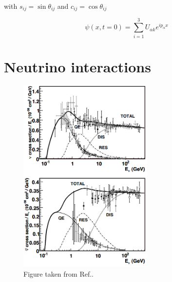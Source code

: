 with $s_{ij}=\sin \theta_{ij}$ and $c_{ij}=\cos \theta_{ij}$

\begin{equation} %
    \psi(x,t=0)=\sum_{i=1}^{3}U_{\alpha k}e^{ip_{\alpha}x}
\end{equation} %

\section{Neutrino interactions}
\label{sec:theory_interactions}

\begin{figure} %
    \includegraphics[origin=c,width=0.6\textwidth]{diagrams/3-theory/cross_sections.png}
    \caption[cross sections short]
    {Figure taken from Ref.\cite{formaggio2012}.}
    \label{fig:cross_sections}
\end{figure} %

